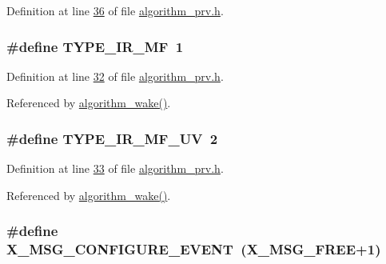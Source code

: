 Definition at line \hyperlink{a00016_source_l00036}{36} of file \hyperlink{a00016_source}{algorithm\+\_\+prv.\+h}.

\hypertarget{a00016_a78bbb321092eab3b988cf0c89bf0a572}{
\subsubsection[{T\+Y\+P\+E\+\_\+\+I\+R\+\_\+\+M\+F}]{\setlength{\rightskip}{0pt plus 5cm}\#define T\+Y\+P\+E\+\_\+\+I\+R\+\_\+\+M\+F~1}}\label{a00016_a78bbb321092eab3b988cf0c89bf0a572}


Definition at line \hyperlink{a00016_source_l00032}{32} of file \hyperlink{a00016_source}{algorithm\+\_\+prv.\+h}.



Referenced by \hyperlink{a00038_source_l00670}{algorithm\+\_\+wake()}.

\hypertarget{a00016_a88096870f430e03f71e1f390c67f09ce}{
\subsubsection[{T\+Y\+P\+E\+\_\+\+I\+R\+\_\+\+M\+F\+\_\+\+U\+V}]{\setlength{\rightskip}{0pt plus 5cm}\#define T\+Y\+P\+E\+\_\+\+I\+R\+\_\+\+M\+F\+\_\+\+U\+V~2}}\label{a00016_a88096870f430e03f71e1f390c67f09ce}


Definition at line \hyperlink{a00016_source_l00033}{33} of file \hyperlink{a00016_source}{algorithm\+\_\+prv.\+h}.



Referenced by \hyperlink{a00038_source_l00670}{algorithm\+\_\+wake()}.

\hypertarget{a00016_a410c7d83b819fa283303a53830c87a96}{
\subsubsection[{X\+\_\+\+M\+S\+G\+\_\+\+C\+O\+N\+F\+I\+G\+U\+R\+E\+\_\+\+E\+V\+E\+N\+T}]{\setlength{\rightskip}{0pt plus 5cm}\#define X\+\_\+\+M\+S\+G\+\_\+\+C\+O\+N\+F\+I\+G\+U\+R\+E\+\_\+\+E\+V\+E\+N\+T~({\bf X\+\_\+\+M\+S\+G\+\_\+\+F\+R\+E\+E}+1)}}\label{a00016_a410c7d83b819fa283303a53830c87a96}


